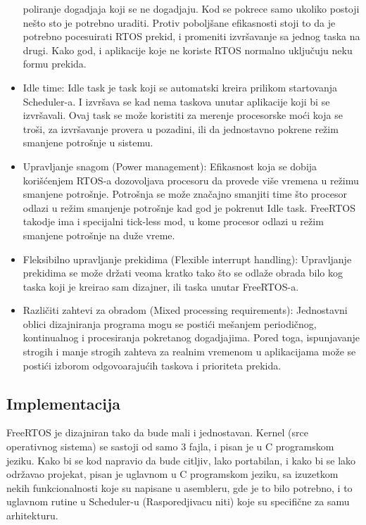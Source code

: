 \documentclass[a4paper,12pt, master]{etf}
\begin{document}
\begin{itemize}
		poliranje dogadjaja koji se ne dogadjaju. Kod se pokrece samo ukoliko postoji ne\v{s}to
		sto je potrebno	uraditi. Protiv pobolj\v{s}ane efikasnosti stoji to da je potrebno pocesuirati
		RTOS prekid, i promeniti izvr\v{s}avanje sa jednog taska na drugi. Kako god, i aplikacije koje ne
		koriste RTOS normalno uklju\v{c}uju neku formu prekida.
		\item Idle time:
		Idle task je task koji se automatski kreira prilikom startovanja Scheduler-a. I izvr\v{s}ava se
		kad nema taskova unutar aplikacije koji bi se izvr\v{s}avali. Ovaj task se mo\v{z}e koristiti za
		merenje procesorske mo\'{c}i koja se tro\v{s}i, za izvr\v{s}avanje provera u pozadini, ili da
		jednostavno pokrene re\v{z}im smanjene potro\v{s}nje u sistemu.
		\item Upravljanje snagom (Power management):
		Efikasnost koja se dobija kori\v{s}\'{c}enjem RTOS-a dozovoljava procesoru da provede vi\v{s}e
		vremena	u re\v{z}imu smanjene potro\v{s}nje. Potro\v{s}nja se mo\v{z}e zna\v{c}ajno smanjiti time
		\v{s}to procesor odlazi u re\v{z}im smanjenje potro\v{s}nje kad god je pokrenut Idle task. FreeRTOS
		takodje ima i specijalni tick-less mod, u kome procesor odlazi u re\v{z}im smanjene
		potro\v{s}nje na du\v{z}e vreme.
		\item Fleksibilno upravljanje prekidima (Flexible interrupt handling):
		Upravljanje prekidima se mo\v{z}e dr\v{z}ati veoma kratko tako \v{s}to se odla\v{z}e obrada bilo kog
		taska koji je kreirao sam dizajner, ili taska unutar FreeRTOS-a.
		\item Razli\v{c}iti zahtevi za obradom (Mixed processing requirements):
		Jednostavni oblici dizajniranja programa mogu se posti\'{c}i me\v{s}anjem periodi\v{c}nog,
		kontinualnog i procesiranja pokretanog dogadjajima. Pored toga, ispunjavanje strogih i
		manje strogih zahteva za realnim vremenom u aplikacijama mo\v{z}e se posti\'{c}i izborom
		odgovoaraju\'{c}ih taskova i prioriteta prekida.

	\end{itemize}

	\subsection{Implementacija}

	FreeRTOS je dizajniran tako da bude mali i jednostavan. Kernel (srce operativnog sistema)
	se sastoji od samo 3 fajla, i pisan je u C programskom jeziku. Kako bi se kod napravio da
	bude citljiv, lako portabilan, i kako bi se lako odr\v{z}avao projekat, pisan je uglavnom u C
	programskom jeziku, sa izuzetkom nekih funkcionalnosti koje su napisane u asembleru, gde je to
	bilo potrebno, i to uglavnom rutine u Scheduler-u (Rasporedjivacu niti) koje su specifi\v{c}ne
	za samu arhitekturu.
\end{document}
